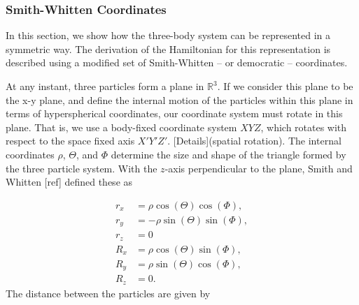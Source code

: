 \documentclass{article}
\begin{document}
\subsubsection{Smith-Whitten Coordinates}\label{smith}

In this section, we show how the three-body system can be represented in a symmetric way. The derivation of the Hamiltonian for this representation is described using a modified set of Smith-Whitten -- or democratic -- coordinates. 

At any instant, three particles form a plane in $\mathbb{R}^3$. If we consider this plane to be the x-y plane, and define the internal motion of the particles within this plane in terms of  hyperspherical coordinates, our coordinate system must rotate in this plane. That is, we use a body-fixed coordinate system $XYZ$, which rotates with respect to the space fixed axis $X'Y'Z'$. [Details](spatial rotation). The internal coordinates $\rho$, $\Theta$, and $\Phi$ determine the size and shape of the triangle formed by the three particle system. With the $z$-axis perpendicular to the plane, Smith and Whitten [ref] defined these as   

\begin{subequations}
\begin{align*}
	r_x &= \rho \cos(\Theta)\cos(\Phi),\\
	r_y &= -\rho \sin(\Theta)\sin(\Phi),\\
	r_z &= 0\\
	R_x &= \rho \cos(\Theta)\sin(\Phi),\\
	R_y &= \rho \sin(\Theta)\cos(\Phi),\\
	R_z &= 0.
\end{align*}   
\end{subequations}
The distance between the particles are given by
\end{document}
